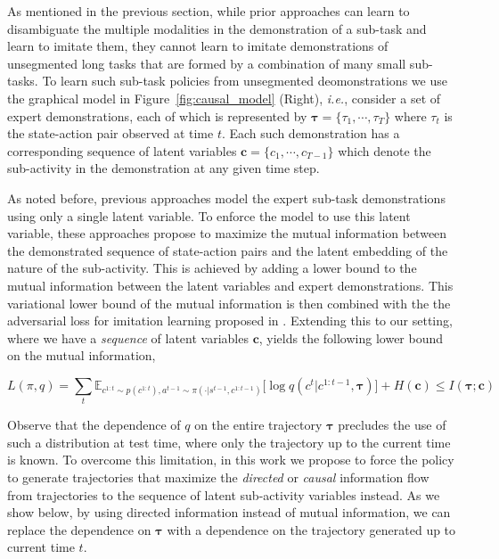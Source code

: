 \documentclass{article} %
\begin{document}

As mentioned in the previous section, while prior approaches can learn to disambiguate the multiple modalities in the demonstration of a sub-task and learn to imitate them, they cannot learn to imitate demonstrations of unsegmented long tasks that are formed by a combination of many small sub-tasks. To learn such sub-task policies from unsegmented deomonstrations we use the graphical model in Figure~\ref{fig:causal_model} (Right), \emph{i.e.}, consider a set of expert demonstrations, each of which is represented by $\boldsymbol{\tau} = \{\tau_1, \cdots, \tau_T\}$ where $\tau_t$ is the state-action pair observed at time $t$. Each such demonstration has a corresponding sequence of latent variables $\boldsymbol{c} = \{c_1, \cdots, c_{T-1}\} $ which denote the sub-activity in the demonstration at any given time step. 

As noted before, previous approaches \citep{li2017infogail, hausman2017multi} model the expert sub-task demonstrations using only a single latent variable. To enforce the model to use this latent variable, these approaches propose to maximize the mutual information between the demonstrated sequence of state-action pairs and the latent embedding of the nature of the sub-activity. This is achieved by adding a lower bound to the mutual information between the latent variables and expert demonstrations. This variational lower bound of the mutual information is then combined with the the adversarial loss for imitation learning proposed in \cite{ho2016generative}. Extending this to our setting, where we have a \emph{sequence} of latent variables $\boldsymbol{c}$, yields the following lower bound on the mutual information,

\begin{equation}
 L(\pi, q) = \sum_{t} \mathbb{E}_{c^{1:t} \sim p(c^{1:t}), a^{t-1} \sim \pi(\cdot | s^{t-1},c^{1:t-1})} \Big[
 \log q(c^{t} | c^{1:t-1}, \boldsymbol{\tau}) \Big] + H(\boldsymbol{c}) \leq I(\boldsymbol{\tau}; \boldsymbol{c})
\end{equation}

Observe that the dependence of $q$ on the entire trajectory $\boldsymbol{\tau}$ precludes the use of such a distribution at test time, where only the trajectory up to the current time is known. To overcome this limitation, in this work we propose to force the policy to generate trajectories that maximize the \textit{directed} or \textit{causal} information flow from trajectories to the sequence of latent sub-activity variables instead. As we show below, by using directed information instead of mutual information, we can replace the dependence on $\boldsymbol{\tau}$ with a dependence on the trajectory generated up to current time $t$.
\end{document}
